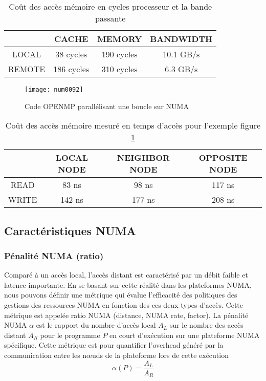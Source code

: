 %
\begin{table}[h!]
\centering
\begin{tabular}{| c | c | c | c |} 
\hline
			& CACHE		& MEMORY 	& BANDWIDTH \\ [0.5ex] \hline
LOCAL  	& 38 cycles   	& 190 cycles 	& 10.1 GB/s      \\ [0.5ex] \hline
REMOTE 	& 186 cycles 	& 310 cycles 	& 6.3 GB/s       \\ [1ex]  \hline
\end{tabular}
\caption{Coût des accès mémoire en cycles processeur et la bande passante} %
\label{table:TB_2_14520}
\end{table}
%
\begin{figure}
\texttt{[image: num0092]}
\centering
\caption{Code OPENMP parallélisant une boucle sur NUMA}
\label{fig:FG_2_num0092}
\end{figure}
%
\begin{table}[h!]
\centering
\begin{tabular}{| c | c | c | c |} 
\hline
			& LOCAL NODE		& NEIGHBOR NODE & OPPOSITE NODE\\ [0.5ex] \hline
READ  	& 83 ns   	& 98 ns  	& 117 ns\\ [0.5ex] \hline
WRITE 	& 142 ns 	& 177 ns  & 208 ns\\ [1ex]  \hline
\end{tabular}
\caption{Coût des accès mémoire mesuré en temps d'accès pour l'exemple figure \ref{fig:FG_2_num0092}} %
\label{table:TB_2_1453}
\end{table}
%
\subsection{Caractéristiques NUMA}
%
\subsubsection{Pénalité NUMA (ratio)}
%
Comparé à un accès local, l'accès distant est caractérisé par un débit faible et latence importante. En se basant sur cette réalité dans les plateformes NUMA, nous pouvons définir une métrique qui évalue l'efficacité des politiques des gestions des ressources NUMA en fonction des ces deux types d'accès. Cette métrique est appelée ratio NUMA (distance, NUMA rate, factor).
La pénalité NUMA $\alpha$ est le rapport du nombre d'accès local $A_L$ sur le nombre des accès distant $A_R$ pour le programme $P$ en court d'exécution sur une plateforme NUMA spécifique. 
Cette métrique est pour quantifier l'overhead généré par la communication entre les nœuds de la plateforme lors de cette exécution \cite{dan-mul}
%
$$
\alpha(P) = \frac{A_L}{A_R}
$$
%
